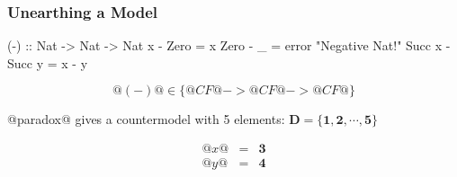 \documentclass[serif,professionalfont]{beamer}
\begin{document}
\begin{frame}[fragile]
  \frametitle{Unearthing a Model}

    \begin{code}
        (-) :: Nat -> Nat -> Nat
        x      - Zero   = x
        Zero   - _      = error "Negative Nat!"
        Succ x - Succ y = x - y
    \end{code}
    $$@(-)@ \in \{ @CF@ -> @CF@ -> @CF@ \}$$

    @paradox@ gives a countermodel with 5 elements:
    $\mathbf{D} = \{\mathbf{1} , \mathbf{2} , \cdots , \mathbf{5}\}$

\pause

\[\begin{array}{rcl}
@x@ & = & \mathbf{3} \\
@y@ & = & \mathbf{4}
\end{array}\]

\end{frame}
\end{document}
